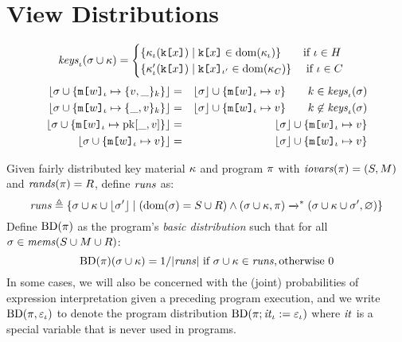\section{View Distributions}


\begin{definition}[Patterns]
  $$
  \mathit{keys}_{\iota}(\sigma \cup \kappa) =
  \begin{cases}
    \{ \kappa_\iota(\texttt{k[}x\texttt{]}) \mid \texttt{k[}x\texttt{]} \in \mathrm{dom}(\kappa_\iota) \} \qquad \text{if} \ \iota \in H \\
    \{ \kappa_\iota'(\texttt{k[}x\texttt{]}) \mid \texttt{k[}x\texttt{]}_{\iota'} \in \mathrm{dom}(\kappa_C)  \} \quad\ \text{if}\ \iota \in C
  \end{cases}
  $$
  \begin{eqnarray*}
    \lfloor \sigma \cup \{ \texttt{m[}w\texttt{]}_{\iota} \mapsto \{ v,\_ \}_{k} \} \rfloor &=&
    \lfloor \sigma \rfloor \cup \{ \texttt{m[}w\texttt{]}_{\iota} \mapsto v \} \qquad k \in \mathit{keys}_{\iota}(\sigma)\\
    \lfloor \sigma \cup \{ \texttt{m[}w\texttt{]}_{\iota} \mapsto \{ \_,v \}_{k} \} \rfloor &=&
    \lfloor \sigma \rfloor \cup \{ \texttt{m[}w\texttt{]}_{\iota} \mapsto v \} \qquad k \not\in \mathit{keys}_{\iota}(\sigma)\\
    \lfloor \sigma \cup \{ \texttt{m[}w\texttt{]}_{\iota} \mapsto \mathrm{pk}[\_,v]\} \rfloor &=&
    \lfloor \sigma \rfloor \cup \{ \texttt{m[}w\texttt{]}_{\iota} \mapsto v \} \\
    \lfloor \sigma \cup \{ \texttt{m[}w\texttt{]}_{\iota} \mapsto v\} \rfloor &=&
    \lfloor \sigma \rfloor \cup \{ \texttt{m[}w\texttt{]}_{\iota} \mapsto v \} 
  \end{eqnarray*}
\end{definition}

\begin{definition}
  \label{def-progtt}
  \label{definition-progtt}
  Given fairly distributed key material $\kappa$ and program $\pi$ with $\mathit{iovars}(\pi) = (S,M)$ and $\mathit{rands}(\pi) = R$,
  define $\mathit{runs}$ as:
  $$
  \mathit{runs} \triangleq \{ \sigma \cup \kappa \cup \lfloor \sigma' \rfloor \mid (\mathrm{dom}(\sigma) = S \cup R) \wedge (\sigma \cup \kappa,\pi) \xrightarrow{}^{*}
  (\sigma \cup \kappa \cup \sigma',\varnothing) \}
  $$
  Define $\mathrm{BD}(\pi)$ as the program's \emph{basic distribution} such that for all
  $\sigma \in \mathit{mems}(S \cup M \cup R)$:
  $$
  \mathrm{BD}(\pi)(\sigma \cup \kappa) =  1 / |\mathit{runs}| \ \text{if}\ \sigma \cup \kappa \in \mathit{runs}, \text{otherwise}\ 0
  $$
  In some cases, we will also be concerned with the (joint)
  probabilities of expression interpretation given a preceding program
  execution, and we write $\mathrm{BD}(\pi, \varepsilon_{\iota})$ to denote the program
  distribution $\mathrm{BD}(\pi;\mathit{it}_{\iota} := \varepsilon_{\iota})$ where $\mathit{it}$ is a
  special variable that is never used in programs.
\end{definition}

